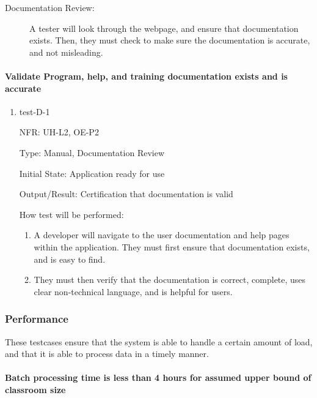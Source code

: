 \documentclass[12pt, titlepage]{article}
\begin{document}
\begin{description}
  \item[Documentation Review:] A tester will look through the webpage, and
  ensure that documentation exists. Then, they must check to make sure the
  documentation is accurate, and not misleading. 
\end{description}

\paragraph{Validate Program, help, and training documentation exists and is accurate}
\begin{enumerate}
  \item{test-D-1}
  
  NFR: UH-L2, OE-P2

  Type: Manual, Documentation Review

  Initial State: Application ready for use

  Output/Result: Certification that documentation is valid

  How test will be performed:
  \begin{enumerate}
    \item A developer will navigate to the user documentation and help pages within the 
    application. They must first ensure that documentation exists, and is easy to find.
    \item They must then verify that the documentation is correct, complete, uses clear
     non-technical language, and is helpful for users.
  \end{enumerate}
\end{enumerate}


\subsubsection{Performance}
These testcases ensure that the system is able to handle a certain amount of load, and that it is able to process data in a timely manner.

\paragraph{Batch processing time is less than 4 hours for assumed upper bound of classroom size}
\end{document}

